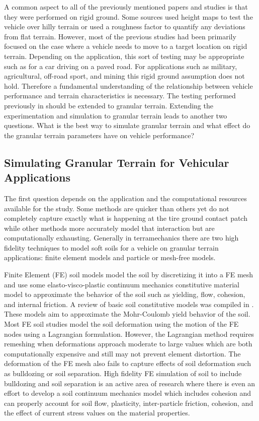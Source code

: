 \documentclass[12pt,onecolumn]{report}
\begin{document}
A common aspect to all of the previously mentioned papers and studies is that they were performed on rigid ground. Some sources used height maps to test the vehicle over hilly terrain or used a roughness factor to quantify any deviations from flat terrain. However, most of the previous studies had been primarily focused on the case where a vehicle needs to move to a target location on rigid terrain. Depending on the application, this sort of testing may be appropriate such as for a car driving on a paved road. For applications such as military, agricultural, off-road sport, and mining this rigid ground assumption does not hold. Therefore a fundamental understanding of the relationship between vehicle performance and terrain characteristics is necessary. The testing performed previously in \cite{ModelFidelity2016} should be extended to granular terrain. Extending the experimentation and simulation to granular terrain leads to another two questions. What is the best way to simulate granular terrain and what effect do the granular terrain parameters have on vehicle performance? 

\subsection{Simulating Granular Terrain for Vehicular Applications}

The first question depends on the application and the computational resources available for the study. Some methods are quicker than others yet do not completely capture exactly what is happening at the tire ground contact patch while other methods more accurately model that interaction but are computationally exhausting. Generally in terramechanics there are two high fidelity techniques to model soft soils for a vehicle on granular terrain applications: finite element models and particle or mesh-free models. 

Finite Element (FE) soil models model the soil by discretizing it into a FE mesh and use some elasto-visco-plastic continuum mechanics constitutive material model to approximate the behavior of the soil such as yielding, flow, cohesion, and internal friction. A review of basic soil constitutive models was compiled in \cite{SoilModels2009}. These models aim to approximate the Mohr-Coulomb yield behavior of the soil. Most FE soil studies model the soil deformation using the motion of the FE nodes using a Lagrangian formulation. However, the Lagrangian method requires remeshing when deformations approach moderate to large values which are both computationally expensive and still may not prevent element distortion. The deformation of the FE mesh also fails to capture effects of soil deformation such as bulldozing or soil separation. High fidelity FE simulation of soil to include bulldozing and soil separation is an active area of research where there is even an effort to develop a soil continuum mechanics model which includes cohesion and can properly account for soil flow, plasticity, inter-particle friction, cohesion, and the effect of current stress values on the material properties. 
\end{document}
